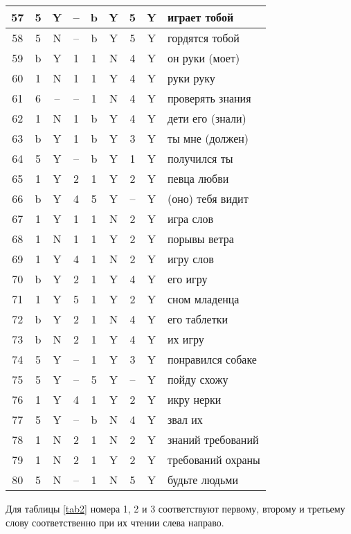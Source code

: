 \documentclass[main]{subfiles}
\begin{document}
\begin{longtable}[c]{|c|c|c|c|c|c|c|c|p{110px}|}
			57&5&Y&--&b&Y&5&Y&играет тобой\\ \hline
			58&5&N&--&b&Y&5&Y&гордятся тобой\\ \hline
			59&b&Y&1&1&N&4&Y&он руки (моет)\\ \hline
			60&1&N&1&1&Y&4&Y&руки руку \\ \hline
			61&6&--&--&1&N&4&Y&проверять знания\\ \hline
			62&1&N&1&b&Y&4& Y&дети его (знали)\\ \hline
			63&b&Y&1&b&Y&3&Y&ты мне (должен) \\ \hline
			64&5&Y&--&b&Y&1&Y&получился ты\\ \hline
			65&1&Y&2&1&Y&2&Y&певца любви\\ \hline
			66&b&Y&4&5&Y&--&Y&(оно) тебя видит\\ \hline
			67&1&Y&1&1&N&2&Y&игра слов \\ \hline
			68&1&N&1&1&Y&2&Y&порывы ветра\\ \hline
			69&1&Y&4&1&N&2&Y&игру слов\\ \hline
			70&b&Y&2&1&Y&4&Y&его игру\\ \hline
			71&1&Y&5&1&Y&2&Y&сном младенца\\ \hline
			72&b&Y&2&1&N&4&Y&его таблетки\\ \hline
			73&b&N&2&1&Y&4&Y&их игру\\ \hline
			74&5&Y&--&1&Y&3&Y&понравился собаке\\ \hline
			75&5&Y&--&5&Y&--&Y&пойду схожу\\ \hline
			76&1&Y&4&1&Y&2&Y&икру нерки\\ \hline
			77&5&Y&--&b&N&4&Y&звал их\\ \hline
			78&1&N&2&1&N&2&Y&знаний требований\\ \hline
			79&1&N&2&1&Y&2&Y&требований охраны \\ \hline
			80&5&N&--&1&N&5&Y&будьте людьми\\ \hline
\end{longtable}
Для таблицы \ref{tab2} номера 1, 2 и 3 соответствуют первому, второму и третьему слову соответственно при их чтении слева направо.
\end{document}
